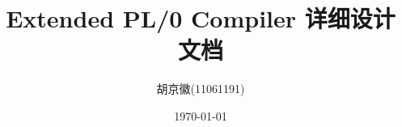 \documentclass[a4paper,fleqn]{article}
\begin{document}
\begin{CJK*}{UTF8}{gbsn}
\title{Extended PL/0 Compiler 详细设计文档}
\author{胡京徽(11061191)}
\date{\today}
\maketitle
\clearpage
%
%

\end{CJK*}
\end{document}
